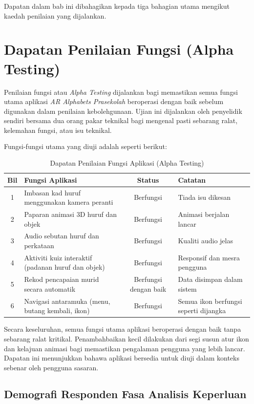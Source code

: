 {{Dapatan dalam bab ini dibahagikan kepada tiga bahagian utama mengikut kaedah penilaian yang dijalankan.
\section{Dapatan Penilaian Fungsi (Alpha Testing)}

Penilaian fungsi atau \textit{Alpha Testing} dijalankan bagi memastikan semua fungsi utama aplikasi \textit{AR Alphabets Prasekolah} beroperasi dengan baik sebelum digunakan dalam penilaian kebolehgunaan. Ujian ini dijalankan oleh penyelidik sendiri bersama dua orang pakar teknikal bagi mengenal pasti sebarang ralat, kelemahan fungsi, atau isu teknikal.

Fungsi-fungsi utama yang diuji adalah seperti berikut:

\begin{table}[H]
\centering
\caption{Dapatan Penilaian Fungsi Aplikasi (Alpha Testing)}
\label{jadual:alphaTesting}
\begin{tabular}{|c|p{8cm}|c|p{4cm}|}
\hline
\textbf{Bil} & \textbf{Fungsi Aplikasi} & \textbf{Status} & \textbf{Catatan} \\
\hline
1 & Imbasan kad huruf menggunakan kamera peranti & Berfungsi & Tiada isu dikesan \\
\hline
2 & Paparan animasi 3D huruf dan objek & Berfungsi & Animasi berjalan lancar \\
\hline
3 & Audio sebutan huruf dan perkataan & Berfungsi & Kualiti audio jelas \\
\hline
4 & Aktiviti kuiz interaktif (padanan huruf dan objek) & Berfungsi & Responsif dan mesra pengguna \\
\hline
5 & Rekod pencapaian murid secara automatik & Berfungsi dengan baik & Data disimpan dalam sistem \\
\hline
6 & Navigasi antaramuka (menu, butang kembali, ikon) & Berfungsi & Semua ikon berfungsi seperti dijangka \\
\hline
\end{tabular}
\end{table}

Secara keseluruhan, semua fungsi utama aplikasi beroperasi dengan baik tanpa sebarang ralat kritikal. Penambahbaikan kecil dilakukan dari segi susun atur ikon dan kelajuan animasi bagi memastikan pengalaman pengguna yang lebih lancar. Dapatan ini menunjukkan bahawa aplikasi bersedia untuk diuji dalam konteks sebenar oleh pengguna sasaran.
\subsection{Demografi Responden Fasa Analisis Keperluan}

}}
